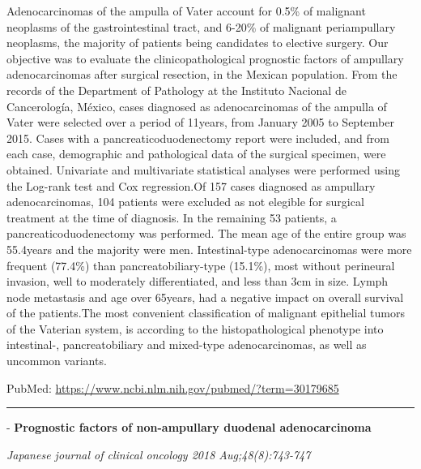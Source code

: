 \documentclass[]{article}
\begin{document}
Adenocarcinomas of the ampulla of Vater account for 0.5\% of malignant
neoplasms of the gastrointestinal tract, and 6-20\% of malignant
periampullary neoplasms, the majority of patients being candidates to
elective surgery. Our objective was to evaluate the clinicopathological
prognostic factors of ampullary adenocarcinomas after surgical
resection, in the Mexican population. From the records of the Department
of Pathology at the Instituto Nacional de Cancerología, México, cases
diagnosed as adenocarcinomas of the ampulla of Vater were selected over
a period of 11years, from January 2005 to September 2015. Cases with a
pancreaticoduodenectomy report were included, and from each case,
demographic and pathological data of the surgical specimen, were
obtained. Univariate and multivariate statistical analyses were
performed using the Log-rank test and Cox regression.Of 157 cases
diagnosed as ampullary adenocarcinomas, 104 patients were excluded as
not elegible for surgical treatment at the time of diagnosis. In the
remaining 53 patients, a pancreaticoduodenectomy was performed. The mean
age of the entire group was 55.4years and the majority were men.
Intestinal-type adenocarcinomas were more frequent (77.4\%) than
pancreatobiliary-type (15.1\%), most without perineural invasion, well
to moderately differentiated, and less than 3cm in size. Lymph node
metastasis and age over 65years, had a negative impact on overall
survival of the patients.The most convenient classification of malignant
epithelial tumors of the Vaterian system, is according to the
histopathological phenotype into intestinal-, pancreatobiliary and
mixed-type adenocarcinomas, as well as uncommon variants.

PubMed: \url{https://www.ncbi.nlm.nih.gov/pubmed/?term=30179685}

{}

{}

\begin{center}\rule{0.5\linewidth}{\linethickness}\end{center}

 - \textbf{Prognostic factors of non-ampullary duodenal adenocarcinoma}

\emph{Japanese journal of clinical oncology 2018 Aug;48(8):743-747}
\end{document}
